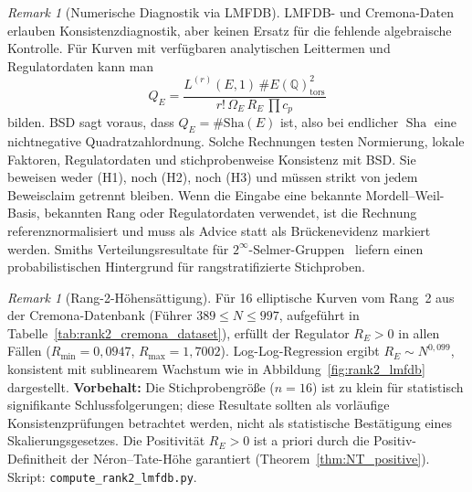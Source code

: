 \documentclass[aps,prd,twocolumn,superscriptaddress,nofootinbib,floatfix]{revtex4-2}
\theoremstyle{definition}
\theoremstyle{remark}
\newtheorem{remark}[theorem]{Remark}
\DeclareMathOperator{\Sha}{Sha}
\begin{document}
\begin{remark}[Numerische Diagnostik via LMFDB]\label{rem:lmfdb-saturation}
LMFDB- und Cremona-Daten erlauben Konsistenzdiagnostik, aber keinen Ersatz für die fehlende algebraische Kontrolle. Für Kurven mit verfügbaren analytischen Leittermen und Regulatordaten kann man
\[
Q_E =
\frac{L^{(r)}(E,1)\,\#E(\mathbb{Q})_{\mathrm{tors}}^2}
     {r!\,\Omega_E\,R_E\,\prod c_p}
\]
bilden. BSD sagt voraus, dass $Q_E=\#\mathrm{Sha}(E)$ ist, also bei endlicher $\Sha$ eine nichtnegative Quadratzahlordnung. Solche Rechnungen testen Normierung, lokale Faktoren, Regulatordaten und stichprobenweise Konsistenz mit BSD. Sie beweisen weder (H1), noch (H2), noch (H3) und müssen strikt von jedem Beweisclaim getrennt bleiben. Wenn die Eingabe eine bekannte Mordell--Weil-Basis, bekannten Rang oder Regulatordaten verwendet, ist die Rechnung referenznormalisiert und muss als Advice statt als Brückenevidenz markiert werden. Smiths Verteilungsresultate für $2^\infty$-Selmer-Gruppen~\cite{Smith2022} liefern einen probabilistischen Hintergrund für rangstratifizierte Stichproben.
\end{remark}

\begin{remark}[Rang-2-Höhensättigung]
\label{rem:rank2-saturation}
Für 16 elliptische Kurven vom Rang~2 aus der Cremona-Datenbank (Führer $389 \leq N \leq 997$, aufgeführt in Tabelle~\ref{tab:rank2_cremona_dataset}), erfüllt der Regulator $R_E > 0$ in allen Fällen ($R_{\min} = 0{,}0947$, $R_{\max} = 1{,}7002$). Log-Log-Regression ergibt $R_E \sim N^{0{,}099}$, konsistent mit sublinearem Wachstum wie in Abbildung~\ref{fig:rank2_lmfdb} dargestellt. \textbf{Vorbehalt:} Die Stichprobengröße ($n = 16$) ist zu klein für statistisch signifikante Schlussfolgerungen; diese Resultate sollten als vorläufige Konsistenzprüfungen betrachtet werden, nicht als statistische Bestätigung eines Skalierungsgesetzes. Die Positivität $R_E > 0$ ist a priori durch die Positiv-Definitheit der Néron--Tate-Höhe garantiert (Theorem~\ref{thm:NT_positive}). Skript: \texttt{compute\_rank2\_lmfdb.py}.
\end{remark}
\end{document}
